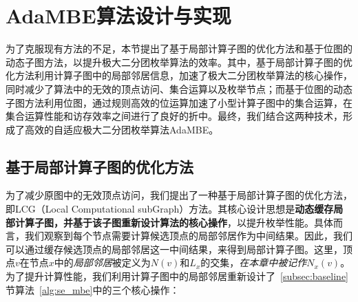 



  

\section{AdaMBE算法设计与实现}

为了克服现有方法的不足，本节提出了基于局部计算子图的优化方法和基于位图的动态子图方法，以提升极大二分团枚举算法的效率。其中，基于局部计算子图的优化方法利用计算子图中的局部邻居信息，加速了极大二分团枚举算法的核心操作，同时减少了算法中的无效的顶点访问、集合运算以及枚举节点；而基于位图的动态子图方法利用位图，通过规则高效的位运算加速了小型计算子图中的集合运算，在集合运算性能和访存效率之间进行了良好的折中。最终，我们结合这两种技术，形成了高效的自适应极大二分团枚举算法AdaMBE。

\subsection{基于局部计算子图的优化方法}
\label{subsec:ada_design_2}

为了减少原图中的无效顶点访问，我们提出了一种基于局部计算子图的优化方法，即LCG（Local Computational subGraph）方法。其核心设计思想是\textbf{动态缓存局部计算子图，并基于该子图重新设计算法的核心操作}，以提升枚举性能。具体而言，我们观察到每个节点需要计算候选顶点的局部邻居作为中间结果。因此，我们可以通过缓存候选顶点的局部邻居这一中间结果，来得到局部计算子图。这里，顶点$v$在节点$x$中的\emph{局部邻居}被定义为$N(v)$和$L_x$的交集，\emph{在本章中被记作$N_x(v)$}。为了提升计算性能，我们利用计算子图中的局部邻居重新设计了~\ref{subsec:baseline}节算法~\ref{alg:se_mbe}中的三个核心操作：

